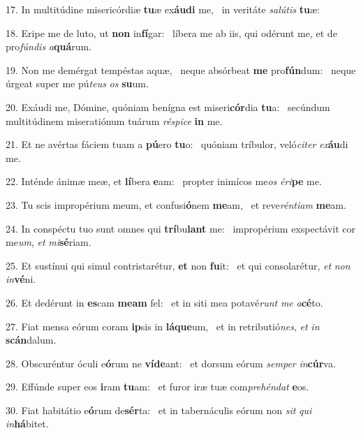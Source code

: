 17. In multitúdine misericórdiæ \textbf{tu}æ ex\textbf{áu}\textbf{di} me, \ast\  in veritáte \textit{sa}\textit{lú}\textit{tis} \textbf{tu}æ:\

18. Eripe me de luto, ut \textbf{non} in\textbf{fí}gar: \ast\  líbera me ab iis, qui odérunt me, et de pro\textit{fún}\textit{dis} \textit{a}\textbf{quá}rum.\

19. Non me demérgat tempéstas aquæ, \dag\  neque absórbeat \textbf{me} pro\textbf{fún}dum: \ast\  neque úrgeat super me pú\textit{te}\textit{us} \textit{os} \textbf{su}um.\

20. Exáudi me, Dómine, quóniam benígna est miseri\textbf{cór}dia \textbf{tu}a: \ast\  secúndum multitúdinem miseratiónum tuárum \textit{ré}\textit{spi}\textit{ce} \textbf{in} me.\

21. Et ne avértas fáciem tuam a \textbf{pú}ero \textbf{tu}o: \ast\  quóniam tríbulor, veló\textit{ci}\textit{ter} \textit{ex}\textbf{áu}di me.\

22. Inténde ánimæ meæ, et \textbf{lí}bera \textbf{e}am: \ast\  propter inimícos me\textit{os} \textit{é}\textit{ri}\textbf{pe} me.\

23. Tu scis impropérium meum, et confusi\textbf{ó}nem \textbf{me}am, \ast\  et reve\textit{rén}\textit{ti}\textit{am} \textbf{me}am.\

24. In conspéctu tuo sunt omnes qui \textbf{trí}bu\textbf{lant} me: \ast\  impropérium exspectávit cor me\textit{um}, \textit{et} \textit{mi}\textbf{sé}riam.\

25. Et sustínui qui simul contristarétur, \textbf{et} non \textbf{fu}it: \ast\  et qui consolarétur, \textit{et} \textit{non} \textit{in}\textbf{vé}ni.\

26. Et dedérunt in \textbf{es}cam \textbf{me}\textbf{am} fel: \ast\  et in siti mea potavé\textit{runt} \textit{me} \textit{a}\textbf{cé}to.\

27. Fiat mensa eórum coram \textbf{ip}sis in \textbf{lá}\textbf{que}um, \ast\  et in retributió\textit{nes}, \textit{et} \textit{in} \textbf{scán}dalum.\

28. Obscuréntur óculi e\textbf{ó}rum ne \textbf{ví}\textbf{de}ant: \ast\  et dorsum eórum \textit{sem}\textit{per} \textit{in}\textbf{cúr}va.\

29. Effúnde super eos \textbf{i}ram \textbf{tu}am: \ast\  et furor iræ tuæ com\textit{pre}\textit{hén}\textit{dat} \textbf{e}os.\

30. Fiat habitátio e\textbf{ó}rum de\textbf{sér}ta: \ast\  et in tabernáculis eórum non \textit{sit} \textit{qui} \textit{in}\textbf{há}bitet.\

